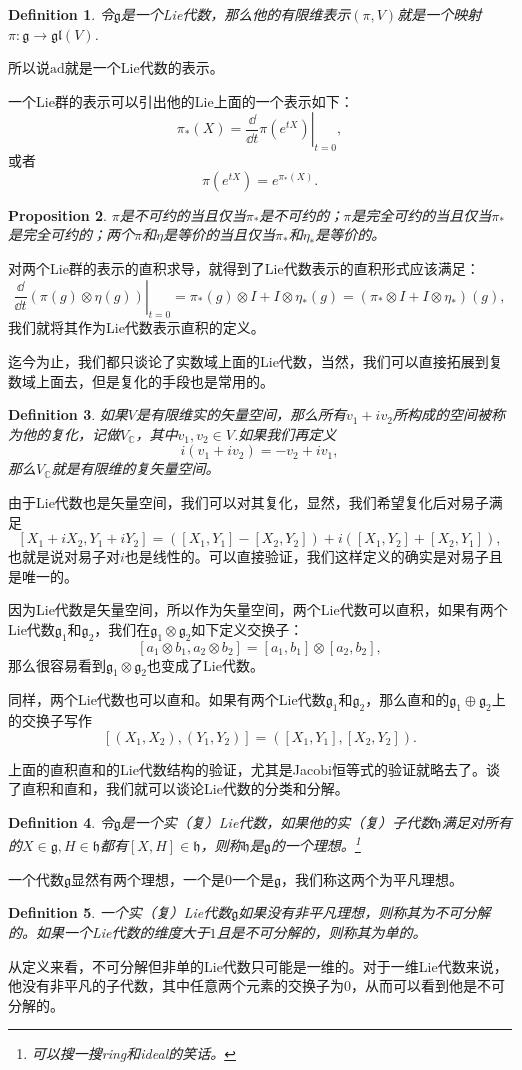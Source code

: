 \documentclass[8pt]{book}
\theoremstyle{plain}
\newtheorem{defi}{Definition}
\newtheorem{pro}[defi]{Proposition}
\newcommand{\cc}{\mathbb{C}}
\newcommand{\lag}{{\mathfrak{g}}}  %
\newcommand{\ad}{{\mathrm{ad}}}
\begin{document}
\begin{defi}
令$\lag$是一个Lie代数，那么他的有限维表示$(\pi,V)$就是一个映射$\pi:\lag\to\mathfrak{gl}(V)$.
\end{defi}

所以说$\ad$就是一个Lie代数的表示。

一个Lie群的表示可以引出他的Lie上面的一个表示如下：
\[
	\pi_*(X)=\left.\frac{\dd}{\dd t}\pi(e^{tX})\right|_{t=0},
\]
或者
\[
	\pi(e^{tX})=e^{\pi_*(X)}.
\]

\begin{pro}
$\pi$是不可约的当且仅当$\pi_*$是不可约的；$\pi$是完全可约的当且仅当$\pi_*$是完全可约的；两个$\pi$和$\eta$是等价的当且仅当$\pi_*$和$\eta_*$是等价的。
\end{pro}

对两个Lie群的表示的直积求导，就得到了Lie代数表示的直积形式应该满足：
\[
	\left.\frac{\dd}{\dd t}(\pi(g)\otimes \eta(g))\right|_{t=0}=\pi_*(g)\otimes I+I\otimes \eta_*(g)=(\pi_*\otimes I+I\otimes \eta_*)(g),
\]
我们就将其作为Lie代数表示直积的定义。

迄今为止，我们都只谈论了实数域上面的Lie代数，当然，我们可以直接拓展到复数域上面去，但是复化的手段也是常用的。

\begin{defi}
如果$V$是有限维实的矢量空间，那么所有$v_1+iv_2$所构成的空间被称为他的复化，记做$V_\cc$，其中$v_1,v_2\in V$.如果我们再定义
\[
i(v_1+iv_2)=-v_2+iv_1,
\]
那么$V_\cc$就是有限维的复矢量空间。
\end{defi}

由于Lie代数也是矢量空间，我们可以对其复化，显然，我们希望复化后对易子满足
\[
[X_1+iX_2,Y_1+iY_2]=([X_1,Y_1]-[X_2,Y_2])+i([X_1,Y_2]+[X_2,Y_1]),
\]
也就是说对易子对$i$也是线性的。可以直接验证，我们这样定义的确实是对易子且是唯一的。

因为Lie代数是矢量空间，所以作为矢量空间，两个Lie代数可以直积，如果有两个Lie代数$\lag_1$和$\lag_2$，我们在$\lag_1\otimes\lag_2$如下定义交换子：
\[
[a_1\otimes b_1,a_2\otimes b_2]=[a_1,b_1]\otimes [a_2,b_2],
\]
那么很容易看到$\lag_1\otimes\lag_2$也变成了Lie代数。

同样，两个Lie代数也可以直和。如果有两个Lie代数$\lag_1$和$\lag_2$，那么直和的$\lag_1\oplus\lag_2$上的交换子写作
\[
	[(X_1,X_2),(Y_1,Y_2)]=([X_1,Y_1],[X_2,Y_2]).
\]

上面的直积直和的Lie代数结构的验证，尤其是Jacobi恒等式的验证就略去了。谈了直积和直和，我们就可以谈论Lie代数的分类和分解。

\begin{defi}
令$\lag$是一个实（复）Lie代数，如果他的实（复）子代数$\mathfrak{h}$满足对所有的$X\in \lag,H \in \mathfrak{h}$都有$[X,H]\in \mathfrak{h}$，则称$\mathfrak{h}$是$\lag$的一个理想。\footnote{可以搜一搜ring和ideal的笑话。}
\end{defi}
一个代数$\lag$显然有两个理想，一个是$0$一个是$\lag$，我们称这两个为平凡理想。
\begin{defi}
一个实（复）Lie代数$\lag$如果没有非平凡理想，则称其为不可分解的。如果一个Lie代数的维度大于$1$且是不可分解的，则称其为单的。
\end{defi}
从定义来看，不可分解但非单的Lie代数只可能是一维的。对于一维Lie代数来说，他没有非平凡的子代数，其中任意两个元素的交换子为0，从而可以看到他是不可分解的。
\end{document}
